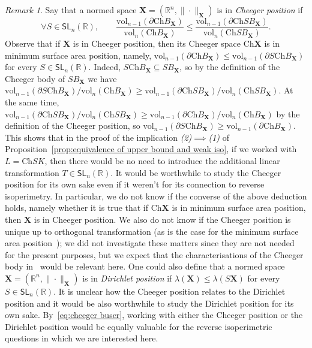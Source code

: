 \documentclass[11pt,reqno]{amsart}
\renewcommand{\le}{\leqslant}
\renewcommand{\ge}{\geqslant}
\newcommand{\X}{\mathbf X}
\newcommand{\R}{\mathbb R}
\theoremstyle{remark}
\newtheorem{remark}[theorem]{Remark}
\newcommand{\SL}{\mathsf{SL}}
\renewcommand{\subset}{\subseteq}
\newcommand{\Ch}{\mathrm{Ch}}
\newcommand{\vol}{\mathrm{vol}}
\renewcommand{\1}{\mathbf 1}
\begin{document}
\begin{remark}\label{rem:cheeger position} Say that a normed space $\X=(\R^n,\|\cdot\|_\X)$ is in {\em Cheeger position} if
$$
\forall S\in \SL_n(\R),\qquad \frac{\vol_{n-1}(\partial \Ch B_\X)}{\vol_{n}(\Ch B_\X)}\le \frac{\vol_{n-1}(\partial \Ch S B_\X)}{\vol_{n}(\Ch S B_\X)}.
$$
Observe that if $\X$ is in Cheeger position, then its Cheeger space $\Ch\X$ is in minimum surface area position, namely, $\vol_{n-1}(\partial \Ch B_\X)\le \vol_{n-1}(\partial S \Ch B_\X)$ for every $S\in \SL_n(\R)$. Indeed, $S\Ch B_\X\subset SB_\X$, so by the definition of the Cheeger body of $SB_\X$ we have $\vol_{n-1}(\partial S \Ch B_\X)/\vol_n(\Ch B_\X)\ge \vol_{n-1}(\partial  \Ch S B_{\X})/\vol_n(\Ch S B_\X)$. At the same time, $\vol_{n-1}(\partial  \Ch S B_{\X})/\vol_n(\Ch S B_\X)\ge \vol_{n-1}(\partial \Ch B_\X)/\vol_{n}(\Ch B_\X)$ by the definition of the Cheeger position, so $\vol_{n-1}(\partial S \Ch B_\X)\ge \vol_{n-1}(\partial \Ch B_\X)$. This shows that in the proof of the implication {\em (2)}$\implies${\em (1)} of Proposition~\ref{prop:equivalence of upper bound and weak iso}, if we worked with $L=\Ch SK$, then there would be no need to introduce the additional linear transformation $T\in \SL_n(\R)$. It would be worthwhile to study the Cheeger position for its own sake even if it weren't for its connection to reverse isoperimetry. In particular, we do not know if the converse of the above deduction holds, namely whether it is true that if $\Ch \X$ is in minimum surface area position, then $\X$ is in Cheeger position. We also do not know if the Cheeger position is unique up to orthogonal transformation (as is the case for the minimum surface area position~\cite{GP99});  we did not investigate these matters since they are not needed for the present purposes, but we  expect that the characterisations of the Cheeger body in~\cite{AC09} would be relevant here. One could also define that a normed space $\X=(\R^n,\|\cdot\|_\X)$ is in {\em Dirichlet position} if $\lambda(\X)\le \lambda(S\X)$ for every $S\in \SL_n(\R)$. It is unclear how the Cheeger position relates to the Dirichlet position and it would be also worthwhile to study the Dirichlet position for its own sake. By~\eqref{eq:cheeger buser}, working with either the Cheeger position or the Dirichlet position would be equally valuable for  the reverse isoperimetric questions in which we are interested here.
\end{remark}
\end{document}

